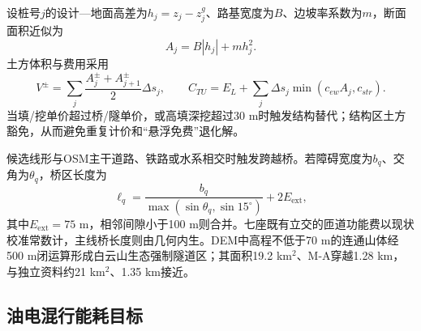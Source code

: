 \documentclass[preprint,12pt]{elsarticle}
\begin{document}
设桩号$j$的设计—地面高差为$h_j=z_j-z^g_j$、路基宽度为$B$、边坡率系数为$m$，断面面积近似为
\begin{equation}
A_j=B|h_j|+mh_j^2.
\end{equation}
土方体积与费用采用
\begin{equation}
V^{\pm}=\sum_j\frac{A_j^{\pm}+A_{j+1}^{\pm}}{2}\Delta s_j,\qquad
C_{TU}=E_L+\sum_j\Delta s_j\min(c_{ew}A_j,c_{str}).
\end{equation}
当填/挖单价超过桥/隧单价，或高填深挖超过30 m时触发结构替代；结构区土方豁免，从而避免重复计价和“悬浮免费”退化解。

候选线形与OSM主干道路、铁路或水系相交时触发跨越桥。若障碍宽度为$b_q$、交角为$\theta_q$，桥区长度为
\begin{equation}
\ell_q=\frac{b_q}{\max(\sin\theta_q,\sin15^\circ)}+2E_{\mathrm{ext}},
\end{equation}
其中$E_{\mathrm{ext}}=75$ m，相邻间隙小于100 m则合并。七座既有立交的匝道功能费以现状校准常数计，主线桥长度则由几何内生。DEM中高程不低于70 m的连通山体经500 m闭运算形成白云山生态强制隧道区；其面积19.2 km$^2$、M-A穿越1.28 km，与独立资料约21 km$^2$、1.35 km接近。

\begin{table}[t]
\centering
\caption{案例当前模型主要参数。}
\end{table}

\subsection{油电混行能耗目标}
\end{document}
